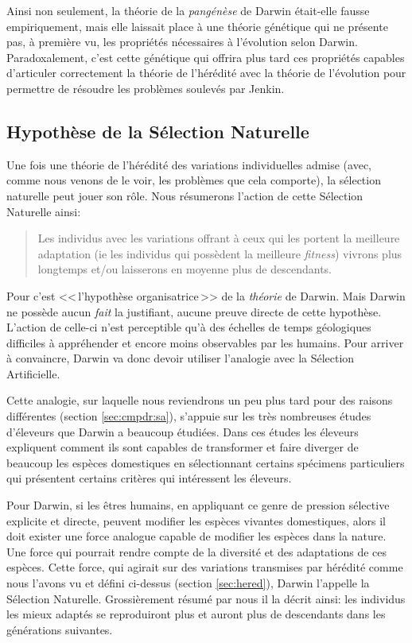 Ainsi non seulement, la théorie de la \emph{pangénèse} de Darwin était-elle fausse empiriquement, mais elle laissait place à une théorie génétique qui ne présente pas, à première vu, les propriétés nécessaires à l'évolution selon Darwin. Paradoxalement, c'est cette génétique qui offrira plus tard ces propriétés capables d'articuler correctement la théorie de l'hérédité avec la théorie de l'évolution pour permettre de résoudre les problèmes soulevés par Jenkin.

\subsection{Hypothèse de la Sélection Naturelle}\label{sec:SN}
Une fois une théorie de l'hérédité des variations individuelles admise (avec, comme nous venons de le voir, les problèmes que cela comporte), la sélection naturelle peut jouer son rôle. Nous résumerons l'action de cette Sélection Naturelle ainsi:
\begin{quote} Les individus avec les variations offrant à ceux qui les portent la meilleure adaptation (ie les individus qui possèdent la meilleure \emph{fitness}) vivrons plus longtemps et/ou laisserons en moyenne plus de descendants.\end{quote}

	Pour \citet[p.~22]{gayon1991darwinetlapresdarwin} c'est <<\,l'hypothèse organisatrice\,>> de la \emph{théorie} de Darwin. Mais Darwin ne possède aucun \emph{fait} la justifiant, aucune preuve directe de cette hypothèse. L'action de celle-ci n'est perceptible qu'à des échelles de temps géologiques difficiles à appréhender et encore moins observables par les humains. Pour arriver à convaincre, Darwin va donc devoir utiliser l'analogie avec la Sélection Artificielle.
	
	Cette analogie, sur laquelle nous reviendrons un peu plus tard pour des raisons différentes (section \ref{sec:cmpdr:sa}), s'appuie sur les très nombreuses études d'éleveurs que Darwin a beaucoup étudiées. Dans ces études les éleveurs expliquent comment ils sont capables de transformer et faire diverger de beaucoup les espèces domestiques en sélectionnant certains spécimens particuliers qui présentent certains critères qui intéressent les éleveurs. 
	
	Pour Darwin, si les êtres humains, en appliquant ce genre de pression sélective explicite et directe, peuvent modifier les espèces vivantes domestiques, alors il doit exister une force analogue capable de modifier les espèces dans la nature. Une force qui pourrait rendre compte de la diversité et des adaptations de ces espèces. Cette force, qui agirait sur des variations transmises par hérédité comme nous l'avons vu et défini ci-dessus (section \ref{sec:hered}), Darwin l'appelle la Sélection Naturelle. Grossièrement résumé par nous il la décrit ainsi: les individus les mieux adaptés se reproduiront plus et auront plus de descendants dans les générations suivantes. 

